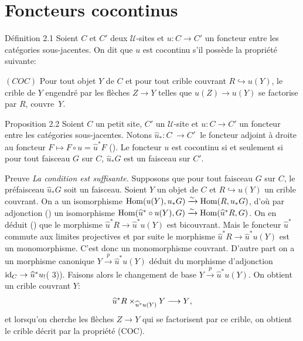 \documentclass[10pt]{../fichiers-configuration-latex/smfart}
\begin{document}
\section{Foncteurs cocontinus}

\begin{enonce*}{Définition 2.1}
Soient $C$ et $C'$ deux $𝒰$-sites et $u:C\rightarrow C'$ un
foncteur entre les catégories sous-jacentes. On dit que $u$ est
cocontinu s'il possède la propriété suivante:

$(COC)$ Pour tout objet $Y$ de $C$ et pour tout crible couvrant
$R\hookrightarrow u(Y)$, le crible de $Y$ engendré par les
flèches $Z\rightarrow Y$ telles que $u(Z)\rightarrow u(Y)$ se
factorise par $R$, couvre~$Y$.
\end{enonce*}

\begin{enonce*}{Proposition 2.2}
Soient $C$ un petit site, $C'$ un $𝒰$-site et
$u:C\rightarrow C'$ un foncteur entre les catégories sous-jacentes.
Notons $\widehat{u}_{\ast}:C^{\widehat{\phantom{,}}}\rightarrow
{C'}^{\widehat{\phantom{,}}}$ le foncteur adjoint à droite au
foncteur $F\mapsto F\circ u=\widehat{u}^{\ast}F$ {\rm
().} Le foncteur $u$ est cocontinu si et seulement si
pour tout faisceau $G$ sur $C$, $\widehat{u}_{\ast}G$ est un
faisceau sur $C'$.
\end{enonce*}

\begin{enonce*}[remark]{Preuve}
\emph{La condition est suffisante.} Supposons que pour tout faisceau
$G$ sur $C$, le préfaisceau $\widehat{u}_{\ast}G$ soit un faisceau.
Soient $Y$ un objet de $C$ et $R\hookrightarrow u(Y)$ un crible
couvrant. On a un isomorphisme $\operatorname{Hom}(u(Y),
u_{\ast}G)\xrightarrow{\sim}\operatorname{Hom}(R,u_{\ast}G)$, d'où par
adjonction () un isomorphisme
$\operatorname{Hom}(\widehat{u}^{\ast}\circ
u(Y),G)\xrightarrow{\sim}\operatorname{Hom}(\widehat{u}^{\ast}R,G)$. On en déduit
() que le morphisme $\widehat{u}^{\ast}R\rightarrow
\widehat{u}^{\ast}u(Y)$ est bicouvrant. Mais le foncteur
$\widehat{u}^{\ast}$ commute aux limites projectives et par suite le
morphisme $\widehat{u}^{\ast}R\rightarrow \widehat{u}^{\ast}u(Y)$
est un monomorphisme. C'est donc un monomorphisme couvrant. D'autre
part on a un morphisme canonique
$Y\xrightarrow{p}\widehat{u}^{\ast}u(Y)$ déduit du morphisme
d'adjonction $\operatorname{id}_C\rightarrow
\widehat{u}^{\ast}u_{!}$\pageoriginale ( 3)). Faisons
alors le changement de base
$Y\xrightarrow{p}\widehat{u}^{\ast}u(Y)$. On obtient un crible
couvrant $Y$:
$$
\widehat{u}^{\ast}R\times_{\widehat{u}^{\ast}u(Y)}Y\longrightarrow
Y{},
$$
et lorsqu'on cherche les flèches $Z\rightarrow Y$ qui se
factorisent par ce crible, on obtient le crible décrit par la
propriété (COC).
\end{enonce*}
\end{document}
